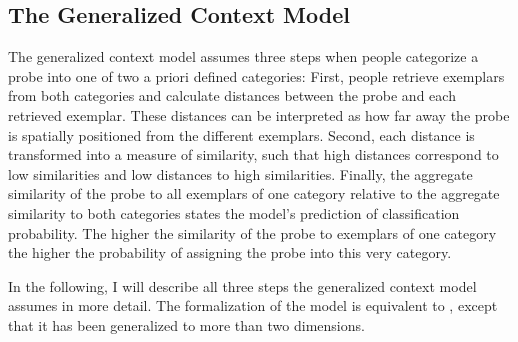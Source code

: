 \documentclass[a4paper,man,natbib]{apa6}
\begin{document}
\subsection{The Generalized Context Model}
The generalized context model \citep{nosofsky1986attention} assumes three steps when people categorize a probe into one of two a priori defined categories: First, people retrieve exemplars from both categories and calculate distances between the probe and each retrieved exemplar. These distances can be interpreted as how far away the probe is spatially positioned from the different exemplars. Second, each distance is transformed into a measure of similarity, such that high distances correspond to low similarities and low distances to high similarities. Finally, the aggregate similarity of the probe to all exemplars of one category relative to the aggregate similarity to both categories states the model's prediction of classification probability. The higher the similarity of the probe to exemplars of one category the higher the probability of assigning the probe into this very category.

In the following, I will describe all three steps the generalized context model assumes in more detail. The formalization of the model is equivalent to \cite[][pp.281--282]{nosofsky1989further}, except that it has been generalized to more than two dimensions. 
\end{document}
